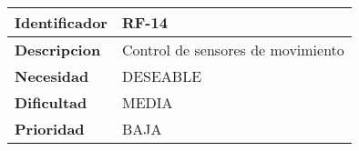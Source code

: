 \begin{center}
    \begin{tabular}{|p{2.6cm}|p{12cm}|}
    \hline
    \textbf{Identificador} & RF-14\\
    \hline
    \textbf{Descripcion} & Control de sensores de movimiento\\
    \hline
    \textbf{Necesidad} & DESEABLE\\
    \hline
    \textbf{Dificultad} & MEDIA\\
    \hline
    \textbf{Prioridad} & BAJA\\
    \hline
    \end{tabular}
\end{center}
